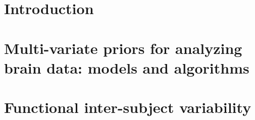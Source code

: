 \documentclass[nobib, a4paper, notoc, twoside, justified, openany]{tufte-book}
\newtheorem{theorem}{Theorem}
\DeclareMathOperator{\dom}{dom}
\DeclareMathOperator{\conv}{conv}
\DeclareMathOperator{\inte}{int }
\begin{document}


{}

 \part{\Huge{Introduction}}


\part{\Huge{Multi-variate priors for analyzing brain data: models and algorithms}}



\part{\Huge{Functional inter-subject variability}}
\end{document}
